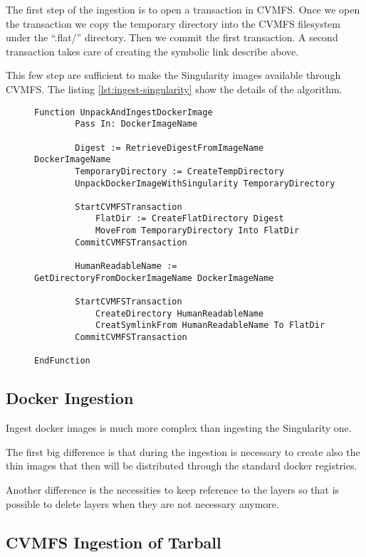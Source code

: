 The first step of the ingestion is to open a transaction in CVMFS. Once we open
the transaction we copy the temporary directory into the CVMFS filesystem under
the “.flat/” directory. Then we commit the first transaction. A second
transaction takes care of creating the symbolic link describe above.

This few step are sufficient to make the Singularity images available through
CVMFS. The listing \ref{lst:ingest-singularity} show the details of the
algorithm.

\begin{figure}
\begin{lstlisting}[caption={Algorithm to unpack a Docker image with Singularity and ingest it into CVMFS}, label={lst:ingest-singularity}]
Function UnpackAndIngestDockerImage
        Pass In: DockerImageName
        
        Digest := RetrieveDigestFromImageName DockerImageName
        TemporaryDirectory := CreateTempDirectory
        UnpackDockerImageWithSingularity TemporaryDirectory

        StartCVMFSTransaction
            FlatDir := CreateFlatDirectory Digest
            MoveFrom TemporaryDirectory Into FlatDir
        CommitCVMFSTransaction

        HumanReadableName := GetDirectoryFromDockerImageName DockerImageName
        
        StartCVMFSTransaction
            CreateDirectory HumanReadableName
            CreatSymlinkFrom HumanReadableName To FlatDir
        CommitCVMFSTransaction

EndFunction
\end{lstlisting}
\end{figure}



\subsection{Docker Ingestion}

Ingest docker images is much more complex than ingesting the Singularity one.

The first big difference is that during the ingestion is necessary to create
also the thin images that then will be distributed through the standard docker
registries.

Another difference is the necessities to keep reference to the layers so that
is possible to delete layers when they are not necessary anymore.

\subsection{CVMFS Ingestion of Tarball}

